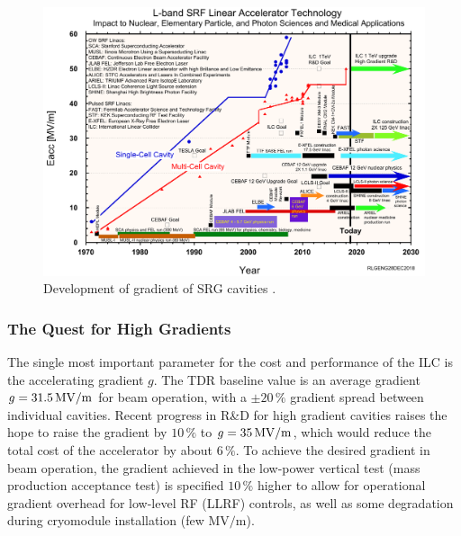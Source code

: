 %

\begin{figure}[htbp]
   \includegraphics[width=0.8 \hsize]{chapters/figures/LBandSRFNbCavityGradientEvolution_ProjectImpact_rev28dec2018}
\caption{Development of gradient of SRG cavities
\cite[updated]{Geng:2015glc}.
}
\label{fig:gradients}
\end{figure}

\subsubsection{The Quest for High Gradients}

The single most important parameter for the cost and performance of the ILC is the accelerating gradient $g$.
The TDR baseline value is an average gradient $g = 31.5\,{\mathrm{MV/m}}$ for beam operation, with a $\pm 20\,\%$ gradient spread between individual cavities.
Recent progress in R\&D for high gradient cavities raises the hope to raise the gradient by  $10\,\%$  to  $g = 35\,{\mathrm{MV/m}}$, which would reduce the total cost of the  accelerator by about  $6\,\%$.
To achieve the desired gradient in beam operation, the gradient achieved in the low-power vertical test (mass production acceptance test) is specified $10\,\%$ higher to allow for operational gradient overhead for low-level
RF (LLRF) controls, as well as some degradation during cryomodule installation (few ${\mathrm{MV/m}}$).

